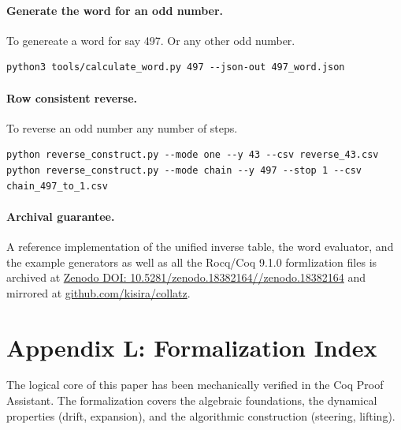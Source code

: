 \documentclass[11pt,letterpaper]{amsart}
\theoremstyle{definition}
\theoremstyle{plain}
\theoremstyle{plain}
\theoremstyle{remark}
\begin{document}
\paragraph{Generate the word for an odd number.}
To genereate a word for say 497. Or any other odd number.
\begin{verbatim}
python3 tools/calculate_word.py 497 --json-out 497_word.json
\end{verbatim}

\paragraph{Row consistent reverse.}
To reverse an odd number any number of steps.
\begin{lstlisting}[basicstyle=\ttfamily\small,breaklines=true]
python reverse_construct.py --mode one --y 43 --csv reverse_43.csv
python reverse_construct.py --mode chain --y 497 --stop 1 --csv chain_497_to_1.csv
\end{lstlisting}



\paragraph{Archival guarantee.}
A reference implementation of the unified inverse table, the word evaluator, and the example generators as well as all the Rocq/Coq 9.1.0 formlization files is archived at
\href{https://doi.org/  DOI: 10.5281/zenodo.18382164//zenodo.18382164}{Zenodo  DOI: 10.5281/zenodo.18382164//zenodo.18382164} and mirrored at
\href{git@github.com:kisira/collatz.git}{github.com/kisira/collatz}.

\section*{Appendix L: Formalization Index}
The logical core of this paper has been mechanically verified in the Coq Proof Assistant. The formalization covers the algebraic foundations, the dynamical properties (drift, expansion), and the algorithmic construction (steering, lifting).

\end{document}
